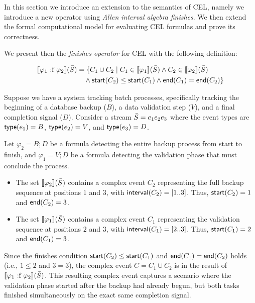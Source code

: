 In this section we introduce an extension to the semantics of CEL, namely we introduce a new operator using \textit{Allen interval algebra} \textit{finishes}. 
We then extend the formal computational model for evaluating CEL formulas and prove its correctness. 

We present then the \emph{finishes operator} for CEL with the following definition:

$$\begin{aligned} 	
	\sem{\varphi_1 \finishes \varphi_2}(\Stream) 	
	&= \{C_1 \cup C_2 \mid C_1 \in \sem{\varphi_1}(\Stream)  	
	\land C_2 \in \sem{\varphi_2}(\Stream) \\ 	
	&\quad \land \cstart(C_2) \leq \cstart(C_1) \land \cend(C_1) = \cend(C_2)\} 
\end{aligned}$$

\begin{example} Suppose we have a system tracking batch processes, specifically tracking the beginning of a database backup ($B$), a data validation step ($V$), and a final completion signal ($D$). Consider a stream $\bar{S} = e_1 e_2 e_3$ where the event types are $\mathsf{type}(e_1) = B$, $\mathsf{type}(e_2) = V$, and $\mathsf{type}(e_3) = D$.
	
	Let $\varphi_2 = B ; D$ be a formula detecting the entire backup process from start to finish, and $\varphi_1 = V ; D$ be a formula detecting the validation phase that must conclude the process.
	\begin{itemize}
		\item The set $\sem{\varphi_2}(\Stream)$ contains a complex event $C_2$ representing the full backup sequence at positions $1$ and $3$, with $\mathsf{interval}(C_2) = [1..3]$. Thus, $\mathsf{start}(C_2) = 1$ and $\mathsf{end}(C_2) = 3$.
		\item The set $\sem{\varphi_1}(\Stream)$ contains a complex event $C_1$ representing the validation sequence at positions $2$ and $3$, with $\mathsf{interval}(C_1) = [2..3]$. Thus, $\mathsf{start}(C_1) = 2$ and $\mathsf{end}(C_1) = 3$.
	\end{itemize}
	
	Since the finishes condition $\mathsf{start}(C_2) \leq \mathsf{start}(C_1)$ and $\mathsf{end}(C_1) = \mathsf{end}(C_2)$ holds (i.e., $1 \leq 2$ and $3 = 3$), the complex event $C = C_1 \cup C_2$ is in the result of $\sem{\varphi_1 \finishes \varphi_2}(\Stream)$. This resulting complex event captures a scenario where the validation phase started after the backup had already begun, but both tasks finished simultaneously on the exact same completion signal.
	
\end{example}

